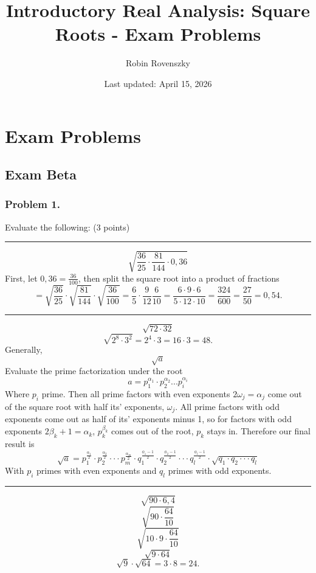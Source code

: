 \documentclass{article}
\title{Introductory Real Analysis: Square Roots - Exam Problems}
\author{Robin Rovenszky}
\date{Last updated: April 15, 2026}
\begin{document}
\maketitle
\tableofcontents
\newpage

\section{Exam Problems}
\subsection{Exam Beta}
\subsubsection{Problem 1.}
Evaluate the following: (3 points)
\vspace{8pt}
    \hrule
    \vspace{8pt}
    \[
    \sqrt{\frac{36}{25}\cdot\frac{81}{144}\cdot0,36}
    \]
    First, let $0,36 = \frac{36}{100}$, then split the square root into a product of fractions
    \[
    =\sqrt{\frac{36}{25}}\cdot \sqrt{\frac{81}{144}}\cdot\sqrt{\frac{36}{100}} = \frac{6}{5}\cdot\frac{9}{12}\frac{6}{10}=\frac{6\cdot9\cdot6}{5\cdot12\cdot10}=\frac{324}{600}=\frac{27}{50}=\boxed{0,54}.
    \]
    \vspace{3pt}
    \hrule 
    \vspace{8pt}
    \[
    \sqrt{72 \cdot 32}
    \]
    \[
    \sqrt{2^8 \cdot 3^2} = 2^4 \cdot 3 = 16 \cdot 3 = 48.
    \]
    Generally,
    \[
    \sqrt{a}
    \]
    Evaluate the prime factorization under the root
    \[
    a = p_1^{\alpha_1} \cdot p_2^{\alpha_2} ... p_i^{\alpha_i}
    \]
    Where $p_i$ prime.
    Then all prime factors with even exponents $2\omega_j = \alpha_j$ come out of the square root with half its' exponents, $\omega_j$. All prime factors with odd exponents come out as half of its' exponents minus 1, so for factors with odd exponents $2\beta_k+1 = \alpha_k$, $p_k^{\beta_k}$ comes out of the root, $p_k$ stays in. 
    Therefore our final result is
    \[
    \sqrt{a} = p_1^{\frac{\alpha_1}{2}} \cdot p_2^{\frac{\alpha_2}{2}} \cdot\cdot\cdot p_m^{\frac{\alpha_m}{2}} \cdot q_1^{\frac{\phi_1 - 1}{2}} \cdot q_2^{\frac{\phi_2 - 1}{2}} \cdot\cdot\cdot q_l^{\frac{\phi_l - 1}{2}} \cdot \sqrt{q_1\cdot q_2 \cdot\cdot\cdot q_l}
    \]
    With  $p_i$ primes with even exponents and $q_l$ primes with odd exponents.
    \vspace{3pt}
    \hrule
    \vspace{8pt}
    \[
    \sqrt{90\cdot6,4}
    \]
    \[
    \sqrt{90 \cdot \frac{64}{10}}
    \]
    \[
    \sqrt{10 \cdot 9 \cdot \frac{64}{10}}
    \]
    \[
    \sqrt{9 \cdot 64}
    \]
    \[
    \sqrt{9} \cdot \sqrt{64} = 3 \cdot 8 = 24.
    \]
\end{document}
